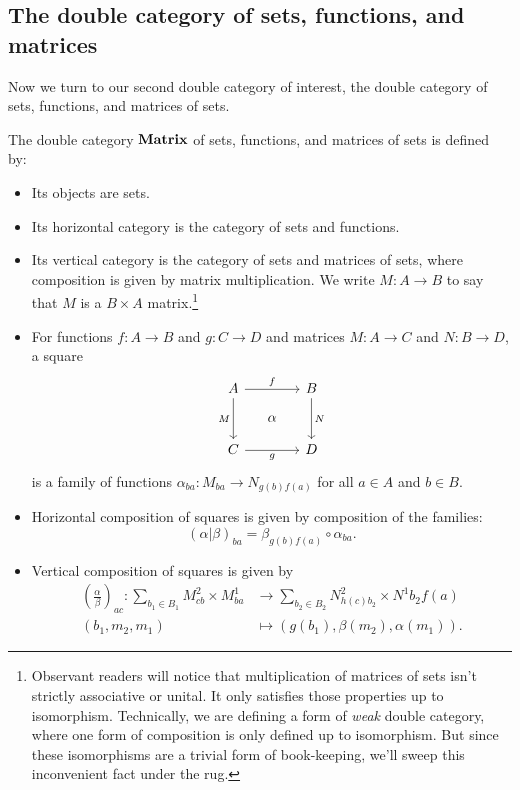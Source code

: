 \documentclass[DynamicalBook]{subfiles}
\begin{document}
\subsection{The double category of sets, functions, and matrices}\label{sec.double_cat_of_matrices}

Now we turn to our second double category of interest, the double category of
sets, functions, and matrices of sets.
\begin{definition}\label{def.double_cat_of_matrices}
  The double category $\textbf{Matrix}$ of sets, functions, and matrices of sets
  is defined by:
  \begin{itemize}
    \item Its objects are sets.
    \item Its horizontal category is the category of sets and functions.
    \item Its vertical category is the category of sets and matrices of sets,
      where composition is given by matrix multiplication. We write $M : A
      \to B$ to say that $M$ is a $B \times A$ matrix.\footnote{Observant
        readers will notice that multiplication of matrices of sets isn't
        strictly associative or unital. It only satisfies those properties up to
      isomorphism. Technically, we are defining a form of \emph{weak} double
      category, where one form of composition is only defined up to isomorphism.
    But since these isomorphisms are a trivial form of book-keeping, we'll sweep
    this inconvenient fact under the rug.}
     \item For functions $f : A \to B$ and $g : C \to D$ and matrices $M : A
       \to C$ and $N : B \to D$, a square
       \[
        \begin{tikzcd}[sep=small]
          A \ar[dd, "M"'] \ar[rr, "f"] & & B \ar[dd, "N"] \\
           & \alpha & \\
          C \ar[rr, "g"'] & & D
        \end{tikzcd}
       \]
       is a family of functions $\alpha_{ba} : M_{ba} \to N_{g(b)f(a)}$ for all
       $a \in A$ and $b \in B$.
     \item Horizontal composition of squares is given by composition of the
       families:
       $$(\alpha | \beta)_{ba} = \beta_{g(b)f(a)} \circ \alpha_{ba}.$$
     \item Vertical composition of squares is given by
       \begin{align*}
         \left( \frac{\alpha}{\beta} \right)_{ac} : \sum_{b_1 \in B_1} M^2_{cb} \times M^1_{ba} &\to \sum_{b_2 \in B_2} N^2_{h(c)b_2} \times N^1{b_2f(a)} \\
         (b_1, m_2, m_1) &\mapsto (g(b_1), \beta(m_2), \alpha(m_1)).
       \end{align*}
  \end{itemize}
\end{definition}
\end{document}

